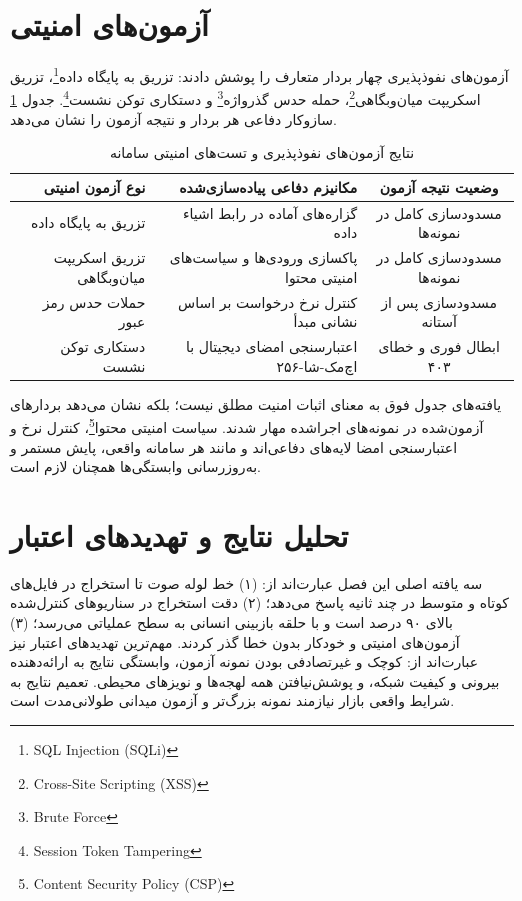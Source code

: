 \documentclass[11pt, a4paper]{report}
\newcommand{\enfootnote}[1]{\footnote{\foreignlanguage{english}{#1}}}
\begin{document}
\section{آزمون‌های امنیتی}
آزمون‌های نفوذپذیری چهار بردار متعارف را پوشش دادند: تزریق به پایگاه داده\enfootnote{SQL Injection (SQLi)}، تزریق اسکریپت میان‌وبگاهی\enfootnote{Cross-Site Scripting (XSS)}، حمله حدس گذرواژه\enfootnote{Brute Force} و دستکاری توکن نشست\enfootnote{Session Token Tampering}. جدول \ref{tab:sec_eval} سازوکار دفاعی هر بردار و نتیجه آزمون را نشان می‌دهد.

\begin{table}[htbp]
\centering
\caption{نتایج آزمون‌های نفوذپذیری و تست‌های امنیتی سامانه}
\label{tab:sec_eval}
\renewcommand{\arraystretch}{1.5}
\begin{tabular}{|r|r|c|}
\hline
\textbf{نوع آزمون امنیتی} & \textbf{مکانیزم دفاعی پیاده‌سازی‌شده} & \textbf{وضعیت نتیجه آزمون} \\ \hline
تزریق به پایگاه داده & گزاره‌های آماده در رابط اشیاء داده & مسدودسازی کامل در نمونه‌ها \\ \hline
تزریق اسکریپت میان‌وبگاهی & پاکسازی ورودی‌ها و سیاست‌های امنیتی محتوا & مسدودسازی کامل در نمونه‌ها \\ \hline
حملات حدس رمز عبور & کنترل نرخ درخواست بر اساس نشانی مبدأ & مسدودسازی پس از آستانه \\ \hline
دستکاری توکن نشست & اعتبارسنجی امضای دیجیتال با اچ‌مک-شا-۲۵۶ & ابطال فوری و خطای ۴۰۳ \\ \hline
\end{tabular}
\end{table}

یافته‌های جدول فوق به معنای اثبات امنیت مطلق نیست؛ بلکه نشان می‌دهد بردارهای آزمون‌شده در نمونه‌های اجرا‌شده مهار شدند. سیاست امنیتی محتوا\enfootnote{Content Security Policy (CSP)}، کنترل نرخ و اعتبارسنجی امضا لایه‌های دفاعی‌اند و مانند هر سامانه واقعی، پایش مستمر و به‌روزرسانی وابستگی‌ها همچنان لازم است.

\section{تحلیل نتایج و تهدیدهای اعتبار}
سه یافته اصلی این فصل عبارت‌اند از: (۱) خط لوله صوت تا استخراج در فایل‌های کوتاه و متوسط در چند ثانیه پاسخ می‌دهد؛ (۲) دقت استخراج در سناریوهای کنترل‌شده بالای ۹۰ درصد است و با حلقه بازبینی انسانی به سطح عملیاتی می‌رسد؛ (۳) آزمون‌های امنیتی و خودکار بدون خطا گذر کردند. مهم‌ترین تهدیدهای اعتبار نیز عبارت‌اند از: کوچک و غیرتصادفی بودن نمونه آزمون، وابستگی نتایج به ارائه‌دهنده بیرونی و کیفیت شبکه، و پوشش‌نیافتن همه لهجه‌ها و نویزهای محیطی. تعمیم نتایج به شرایط واقعی بازار نیازمند نمونه بزرگ‌تر و آزمون میدانی طولانی‌مدت است.
\end{document}
